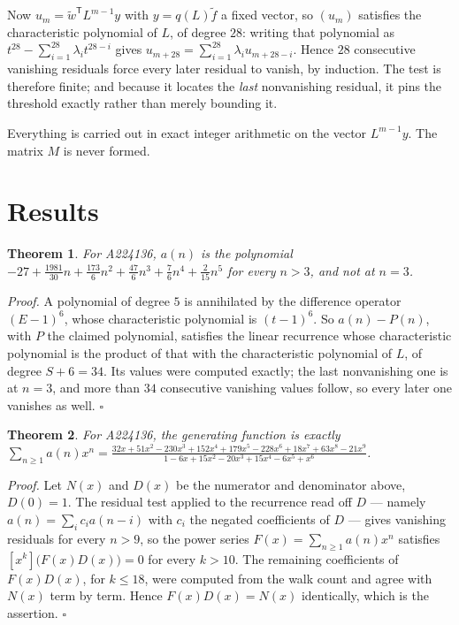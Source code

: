 \documentclass[11pt]{article}
\newtheorem{theorem}{Theorem}
\theoremstyle{definition}
\begin{document}
Now $u_m = \tilde w^{\mathsf T} L^{m-1} y$ with $y = q(L)\tilde f$ a fixed vector, so $(u_m)$ satisfies the characteristic polynomial of $L$, of degree $28$: writing that polynomial as $t^{28} - \sum_{i=1}^{28} \lambda_i t^{28-i}$ gives $u_{m+28} = \sum_{i=1}^{28} \lambda_i u_{m+28-i}$. Hence $28$ consecutive vanishing residuals force every later residual to vanish, by induction. The test is therefore finite; and because it locates the {\itshape last} nonvanishing residual, it pins the threshold exactly rather than merely bounding it.

Everything is carried out in exact integer arithmetic on the vector $L^{m-1}y$. The matrix $M$ is never formed.

\section{Results}

\begin{theorem} For A224136, $a(n)$ is the polynomial $-27 + \frac{1981}{30}n + \frac{173}{6}n^{2} + \frac{47}{6}n^{3} + \frac{7}{6}n^{4} + \frac{2}{15}n^{5}$ for every $n > 3$, and not at $n = 3$.\end{theorem}

{\itshape Proof.} A polynomial of degree $5$ is annihilated by the difference operator $(E-1)^{6}$, whose characteristic polynomial is $(t-1)^{6}$. So $a(n) - P(n)$, with $P$ the claimed polynomial, satisfies the linear recurrence whose characteristic polynomial is the product of that with the characteristic polynomial of $L$, of degree $S + 6 = 34$. Its values were computed exactly; the last nonvanishing one is at $n = 3$, and more than $34$ consecutive vanishing values follow, so every later one vanishes as well. $\square$

\begin{theorem} For A224136, the generating function is exactly $\sum_{n\ge 1} a(n)x^n = \frac{32x + 51x^{2} - 230x^{3} + 152x^{4} + 179x^{5} - 228x^{6} + 18x^{7} + 63x^{8} - 21x^{9}}{1 - 6x + 15x^{2} - 20x^{3} + 15x^{4} - 6x^{5} + x^{6}}$.\end{theorem}

{\itshape Proof.} Let $N(x)$ and $D(x)$ be the numerator and denominator above, $D(0)=1$. The residual test applied to the recurrence read off $D$ --- namely $a(n) = \sum_i c_i a(n-i)$ with $c_i$ the negated coefficients of $D$ --- gives vanishing residuals for every $n > 9$, so the power series $F(x)=\sum_{n\ge 1}a(n)x^n$ satisfies $[x^k]\bigl(F(x)D(x)\bigr) = 0$ for every $k > 10$. The remaining coefficients of $F(x)D(x)$, for $k \le 18$, were computed from the walk count and agree with $N(x)$ term by term. Hence $F(x)D(x) = N(x)$ identically, which is the assertion. $\square$
\end{document}
